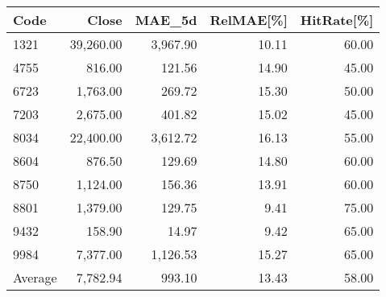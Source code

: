 \begingroup
\footnotesize
\begin{tabular}{lrrrr}
\hline
Code & Close & MAE\_5d & RelMAE[\%] & HitRate[\%] \\
\hline
1321 & 39,260.00 & 3,967.90 & 10.11 & 60.00 \\
4755 & 816.00 & 121.56 & 14.90 & 45.00 \\
6723 & 1,763.00 & 269.72 & 15.30 & 50.00 \\
7203 & 2,675.00 & 401.82 & 15.02 & 45.00 \\
8034 & 22,400.00 & 3,612.72 & 16.13 & 55.00 \\
8604 & 876.50 & 129.69 & 14.80 & 60.00 \\
8750 & 1,124.00 & 156.36 & 13.91 & 60.00 \\
8801 & 1,379.00 & 129.75 & 9.41 & 75.00 \\
9432 & 158.90 & 14.97 & 9.42 & 65.00 \\
9984 & 7,377.00 & 1,126.53 & 15.27 & 65.00 \\
Average & 7,782.94 & 993.10 & 13.43 & 58.00 \\
\hline
\end{tabular}
\endgroup